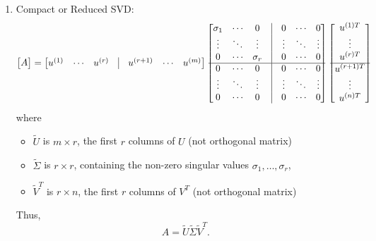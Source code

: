 \begin{definition}
\begin{enumerate}
        \item Compact or Reduced SVD:
        \[
        \begin{bmatrix} A \end{bmatrix} = 
        \begin{bmatrix} 
        u^{(1)} & \cdots & u^{(r)} & \vline & u^{(r+1)} & \cdots & u^{(m)} 
        \end{bmatrix}
        \begin{bmatrix}
            \sigma_1 & \cdots & 0 & \vline & 0 & \cdots & 0 \\
            \vdots & \ddots & \vdots & \vline & \vdots & \ddots & \vdots \\
            0 & \cdots & \sigma_r & \vline & 0 & \cdots & 0 \\
            \hline
            0 & \cdots & 0 & \vline & 0 & \cdots & 0 \\
            \vdots & \ddots & \vdots & \vline & \vdots & \ddots & \vdots \\
            0 & \cdots & 0 & \vline & 0 & \cdots & 0 
        \end{bmatrix}
        \begin{bmatrix}
            u^{(1) T} \\
            \vdots \\
            u^{(r) T} \\
            \hline
            u^{(r+1) T} \\
            \vdots \\
            u^{(n) T}
        \end{bmatrix}
        \]
        where
        \begin{itemize}
            \item \( \tilde{U} \) is \( m \times r \), the first \( r \) columns of \( U \) (not orthogonal matrix)
            \item \( \tilde{\Sigma} \) is \( r \times r \), containing the non-zero singular values \( \sigma_1, \dots, \sigma_r \),
            \item \( \tilde{V}^T \) is \( r \times n \), the first \( r \) columns of \( V^T \) (not orthogonal matrix)
        \end{itemize}
    
        Thus,
        \[
        A = \tilde{U} \tilde{\Sigma} \tilde{V}^T.
        \]
    \end{enumerate}
\end{definition}

